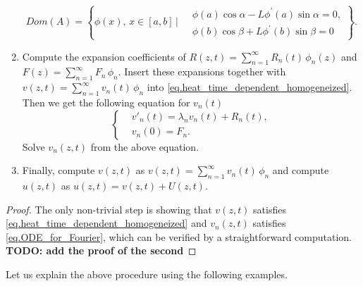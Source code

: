 \begin{theorem}
\begin{enumerate}
\begin{equation}
        \textit{Dom}(A) = \left\{\phi(x),\, x\in [a, b]\,\Bigg|\begin{aligned}
            &\ \phi(a) \cos \alpha-L \phi^{\prime}(a) \sin \alpha=0,
            \\
            &\ \phi(b) \cos \beta+L \phi^{\prime}(b) \sin \beta=0
        \end{aligned}
        \right\}.
    \end{equation}
    \item Compute the expansion coefficients of $R(z, t) = \sum_{n = 1}^\infty R_n(t)\, \phi_n(z)$ and $F(z) = \sum_{n = 1}^\infty F_n\, \phi_n$. Insert these expansions together with $v(z, t) = \sum_{n = 1}^\infty v_n(t)\, \phi_n$ into \eqref{eq.heat_time_dependent_homogeneized}. Then we get the following equation for $v_n(t)$ 
    \begin{equation}\label{eq.ODE_for_Fourier}
        \left\{\begin{aligned} 
            &v'_n(t) = \lambda_n v_n(t) + R_n(t), 
            \\
            &v_n(0)=F_n.
        \end{aligned}\right.
    \end{equation}
    Solve $v_n(z, t)$ from the above equation.
    \item Finally, compute $v(z, t)$ as $v(z, t) = \sum_{n = 1}^\infty v_n(t)\, \phi_n$ and compute $u(z, t)$ as $u(z, t) = v(z, t) + U(z, t)$.
    \end{enumerate}
\end{theorem}
\begin{proof}
    The only non-trivial step is showing that $v(z, t)$ satisfies \eqref{eq.heat_time_dependent_homogeneized} and $v_n(z, t)$ satisfies \eqref{eq.ODE_for_Fourier}, which can be verified by a straightforward computation. \textbf{TODO: add the proof of the second}
\end{proof}

Let us explain the above procedure using the following examples.

